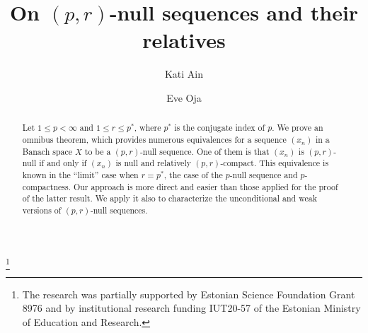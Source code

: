 \documentclass[a4paper,11pt]{amsart}
\theoremstyle{definition}
\theoremstyle{definition}
\theoremstyle{definition}
\begin{document}
\title[On $(p,r)$-null sequences and their relatives]{On $(p,r)$-null sequences and their relatives}

\author{Kati Ain}
\address{Kati Ain, Faculty of Mathematics and Computer Science, Tartu University, J. Liivi 2, 50409 Tartu, Estonia}
\author{Eve Oja}
\address{Eve Oja, Faculty of Mathematics and Computer Science, Tartu University, J. Liivi 2, 50409 Tartu, Estonia; Estonian Academy of Sciences, Kohtu 6, 10130 Tallinn, Estonia} 
\thanks{The research was partially supported by
Estonian Science Foundation Grant 8976 and by institutional research funding IUT20-57 of the Estonian Ministry of Education and Research.}

\begin{abstract}
Let $1\leq p < \infty$ and $1\leq r \leq {p^{\ast}}$, where ${p^{\ast}}$ is the conjugate index of $p$. We prove an omnibus theorem, which provides numerous equivalences for a sequence $(x_n)$ in a Banach space $X$ to be a ${{(p,r)}}$-null sequence. One of them is that $(x_n)$  is ${{(p,r)}}$-null if and only if $(x_n)$ is null and relatively ${{(p,r)}}$-compact. This equivalence is known in the ``limit'' case when $r={p^{\ast}}$, the case of the $p$-null sequence and $p$-compactness. Our approach is more direct and easier than those applied for the proof of the latter result. We apply it also to characterize the unconditional and weak versions of ${{(p,r)}}$-null sequences.
\end{abstract}

\maketitle
\end{document}
